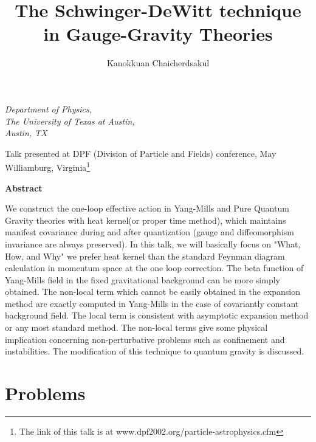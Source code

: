 \documentclass[a4paper,12 pt]{article}
\begin{document}
\title{The Schwinger-DeWitt technique in Gauge-Gravity
Theories} \maketitle
\begin{center}
\author{Kanokkuan Chaicherdsakul}

\emph{Department of Physics, \\The University of Texas at Austin,
\\Austin, TX}

\end{center}

 Talk
presented at DPF (Division of Particle and Fields) \coordHE{}
conference, May \coordHE{} Williamburg, Virginia\footnote{The
link of this talk is at www.dpf2002.org/particle-astrophysics.cfm}



\begin{center} \textbf{Abstract}\end{center}
We construct the one-loop effective action in Yang-Mills and Pure
Quantum Gravity theories with heat kernel(or proper time method),
which maintains manifest covariance during and after quantization
(gauge and diffeomorphism invariance are always preserved).  In
this talk, we will basically focus on "What, How, and Why" we
prefer heat kernel than the standard Feynman diagram calculation
in momentum space at the one loop correction. The beta function of
Yang-Mills field in the fixed gravitational background can be more
simply obtained. The non-local term which cannot be easily
obtained in the expansion method are exactly computed in
Yang-Mills in the case of covariantly constant background field.
The local term is consistent with asymptotic expansion method or
any most standard method. The non-local terms give some physical
implication concerning non-perturbative problems such as
confinement and instabilities. The modification of this technique
to quantum gravity is discussed.

\section{Problems}
\end{document}
